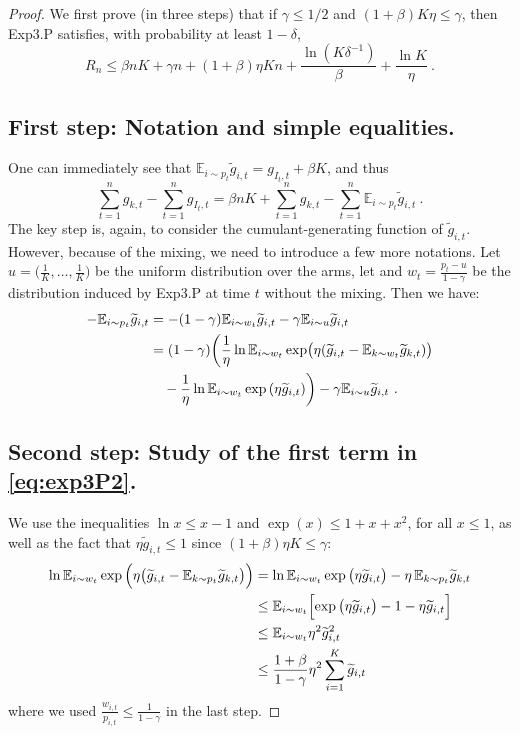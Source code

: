 \documentclass[11pt]{hackednow}
\newcommand{\E}{\mathbb{E}}
\renewcommand{\tilde}{\widetilde}
\begin{document}
\begin{proof}
We first prove (in three steps) that if $\gamma \leq 1/2$ and $(1+\beta) K \eta \leq \gamma$, then Exp3.P satisfies, with probability at least $1-\delta$,
\begin{equation} \label{eq:exp3Plem}
R_n \leq \beta n K + \gamma n + (1+\beta) \eta K n + \frac{\ln(K \delta^{-1})}{\beta} + \frac{\ln K}{\eta}~.
\end{equation}

\subsection*{First step: Notation and simple equalities.}
%
One can immediately see that $\E_{i \sim p_t} \tilde{g}_{i,t} = g_{I_t,t} + \beta K$, and thus
%
\begin{equation} \label{eq:exp3P1}
\sum_{t=1}^n g_{k,t} - \sum_{t=1}^n g_{I_t,t} = \beta n K  + \sum_{t=1}^n g_{k,t} - \sum_{t=1}^n \E_{i \sim p_t} \tilde{g}_{i,t}~.
\end{equation}
%
The key step is, again, to consider the cumulant-generating function of $\tilde{g}_{i,t}$. However, because of the mixing, we need to introduce a few more notations. Let $u=\bigl(\tfrac{1}{K},\hdots,\tfrac{1}{K}\bigr)$ be the uniform distribution over the arms, let and $w_t = \tfrac{p_t - u}{1-\gamma}$ be the distribution induced by Exp3.P at time $t$ without the mixing. Then we have:
\begin{align} 
- \E_{i \sim p_t} \tilde{g}_{i,t} & = - (1-\gamma) \E_{i \sim w_t} \tilde{g}_{i,t} - \gamma \E_{i \sim u} \tilde{g}_{i,t} \notag \\
& = (1-\gamma) \biggl( \frac{1}{\eta} \ln \E_{i \sim w_t} \exp \bigl( \eta (\tilde{g}_{i,t} - \E_{k \sim w_t} \tilde{g}_{k,t}) \bigr) \notag \\
& \quad - \frac{1}{\eta} \ln \E_{i \sim w_t} \exp\left( \eta \tilde{g}_{i,t} \right) \biggr) - \gamma \E_{i \sim u} \tilde{g}_{i,t}~. \label{eq:exp3P2} 
\end{align}

\subsection*{Second step: Study of the first term in \eqref{eq:exp3P2}.}
We use the inequalities $\ln x \leq x-1$ and $\exp(x) \leq 1 + x + x^2$, for all $x \leq 1$, as well as the fact that $\eta \tilde{g}_{i,t} \leq 1$ since $(1+\beta) \eta K \leq \gamma$:
\begin{align}
\ln \E_{i \sim w_t} \exp{\Bigl( \eta \bigl(\tilde{g}_{i,t} - \E_{k \sim p_t} \tilde{g}_{k,t}\bigr) \Bigr)} \notag
& = \ln \E_{i \sim w_t} \exp{\bigl( \eta \tilde{g}_{i,t}\bigr)} - \eta\,\E_{k \sim p_t} \tilde{g}_{k,t} \notag \\
&\leq \E_{i \sim w_t} \Bigl[\exp{\bigl( \eta \tilde{g}_{i,t}\bigr)} - 1 - \eta \tilde{g}_{i,t} \Bigr] \notag \\
&\leq \E_{i \sim w_t} \eta^2 \tilde{g}_{i,t}^2  \notag \\
&\leq \frac{1+\beta}{1-\gamma} \eta^2 \sum_{i=1}^K \tilde{g}_{i,t} \label{eq:exp3P3}
\end{align}
where we used $\frac{w_{i,t}}{p_{i,t}} \leq \frac{1}{1-\gamma}$ in the last step.


\end{proof}
\end{document}
